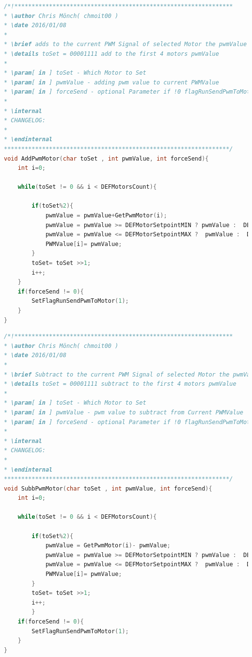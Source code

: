 \begin{lstlisting}[language=C++,firstnumber=96]
/*!***************************************************************
* \author Chris Mönch( chmoit00 )
* \date 2016/01/08
*
* \brief adds to the current PWM Signal of selected Motor the pwmValue
* \details toSet = 00001111 add to the first 4 motors pwmValue
*
* \param[ in ] toSet - Which Motor to Set
* \param[ in ] pwmValue - adding pwm value to current PWMValue
* \param[ in ] forceSend - optional Parameter if !0 flagRunSendPwmToMotor will be set
*
* \internal
* CHANGELOG:
*
* \endinternal
*****************************************************************/
void AddPwmMotor(char toSet , int pwmValue, int forceSend){
	int i=0;
	
	while(toSet != 0 && i < DEFMotorsCount){
	
		if(toSet%2){
			pwmValue = pwmValue+GetPwmMotor(i);
			pwmValue = pwmValue >= DEFMotorSetpointMIN ? pwmValue :  DEFMotorSetpointMIN;
			pwmValue = pwmValue <= DEFMotorSetpointMAX ?  pwmValue :  DEFMotorSetpointMAX;
			PWMValue[i]= pwmValue;
		}
		toSet= toSet >>1;
		i++;
	}
	if(forceSend != 0){
		SetFlagRunSendPwmToMotor(1);
	}
}

\end{lstlisting}

\begin{lstlisting}[language=C++,firstnumber=131]
/*!***************************************************************
* \author Chris Mönch( chmoit00 )
* \date 2016/01/08
*
* \brief Subtract to the current PWM Signal of selected Motor the pwmValue
* \details toSet = 00001111 subtract to the first 4 motors pwmValue
*
* \param[ in ] toSet - Which Motor to Set
* \param[ in ] pwmValue - pwm value to subtract from Current PWMValue
* \param[ in ] forceSend - optional Parameter if !0 flagRunSendPwmToMotor will be set
*
* \internal
* CHANGELOG:
*
* \endinternal
*****************************************************************/
void SubbPwmMotor(char toSet , int pwmValue, int forceSend){
	int i=0;
	
	while(toSet != 0 && i < DEFMotorsCount){
	
		if(toSet%2){
			pwmValue = GetPwmMotor(i)- pwmValue;
			pwmValue = pwmValue >= DEFMotorSetpointMIN ? pwmValue :  DEFMotorSetpointMIN;
			pwmValue = pwmValue <= DEFMotorSetpointMAX ?  pwmValue :  DEFMotorSetpointMAX;
			PWMValue[i]= pwmValue;
		}
		toSet= toSet >>1;
		i++;
		}
	if(forceSend != 0){
		SetFlagRunSendPwmToMotor(1);
	}
}
\end{lstlisting}

